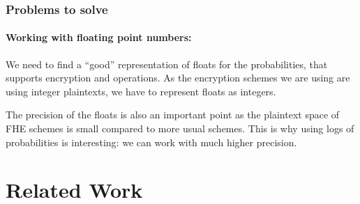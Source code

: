 \documentclass[11pt]{article}
\begin{document}
\subsubsection{Problems to solve} %
\label{ssub:problems_bayes}
\paragraph{Working with floating point numbers:} We need to find a ``good'' representation of floats for the probabilities, that supports encryption and operations. As the encryption schemes we are using are using integer plaintexts, we have to represent floats as integers. 

The precision of the floats is also an important point as the plaintext space of FHE schemes is small compared to more usual schemes. This is why using logs of probabilities is interesting: we can work with much higher precision. 


\section{Related Work} %
\label{sec:related_work}
        
\end{document}
